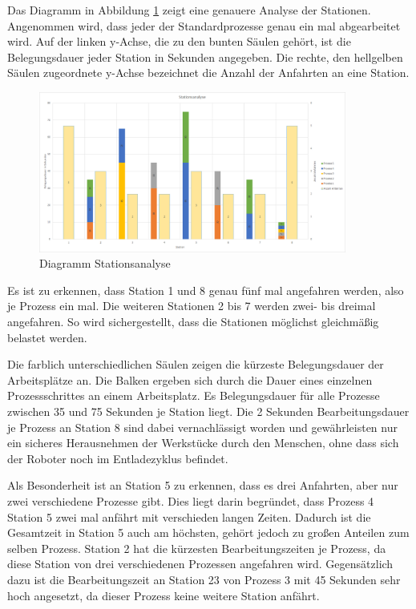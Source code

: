 Das Diagramm in Abbildung \ref{fig:Stationsanalyse} zeigt eine genauere Analyse der Stationen. Angenommen wird, dass jeder der Standardprozesse genau ein mal abgearbeitet wird. Auf der linken y-Achse, die zu den bunten Säulen gehört, ist die Belegungsdauer jeder Station in Sekunden angegeben. Die rechte, den hellgelben Säulen zugeordnete y-Achse bezeichnet die Anzahl der Anfahrten an eine Station. 

\begin{figure}[htb]
    \centering
    \includegraphics[width=0.9\textwidth]{Abbildungen/Stationsanalyse.PNG}
    \caption{Diagramm Stationsanalyse}		
    \label{fig:Stationsanalyse}
\end{figure}

Es ist zu erkennen, dass Station 1 und 8 genau fünf mal angefahren werden, also je Prozess ein mal. Die weiteren Stationen 2 bis 7 werden zwei- bis dreimal angefahren. So wird sichergestellt, dass die Stationen möglichst gleichmäßig belastet werden. 

Die farblich unterschiedlichen Säulen zeigen die kürzeste Belegungsdauer der Arbeitsplätze an. Die Balken ergeben sich durch die Dauer eines einzelnen Prozessschrittes an einem Arbeitsplatz. Es  Belegungsdauer für alle Prozesse zwischen 35 und 75 Sekunden je Station liegt. Die 2 Sekunden Bearbeitungsdauer je Prozess an Station 8 sind dabei vernachlässigt worden und gewährleisten nur ein sicheres Herausnehmen der Werkstücke durch den Menschen, ohne dass sich der Roboter noch im Entladezyklus befindet. 

Als Besonderheit ist an Station 5 zu erkennen, dass es drei Anfahrten, aber nur zwei verschiedene Prozesse gibt. Dies liegt darin begründet, dass Prozess 4 Station 5 zwei mal anfährt mit verschieden langen Zeiten. Dadurch ist die Gesamtzeit in Station 5 auch am höchsten, gehört jedoch zu großen Anteilen zum selben Prozess. Station 2 hat die kürzesten Bearbeitungszeiten je Prozess, da diese Station von drei verschiedenen Prozessen angefahren wird. Gegensätzlich dazu ist die Bearbeitungszeit an Station 23 von Prozess 3 mit 45 Sekunden sehr hoch angesetzt, da dieser Prozess keine weitere Station anfährt. 

